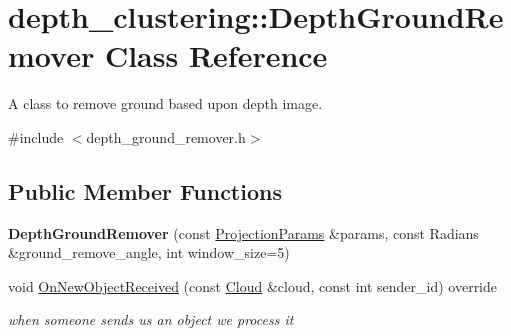 \hypertarget{classdepth__clustering_1_1DepthGroundRemover}{\section{depth\-\_\-clustering\-:\-:Depth\-Ground\-Remover Class Reference}
\label{classdepth__clustering_1_1DepthGroundRemover}
}


A class to remove ground based upon depth image.  




{\ttfamily \#include $<$depth\-\_\-ground\-\_\-remover.\-h$>$}

\subsection*{Public Member Functions}
\begin{DoxyCompactItemize}
\item 
\hypertarget{classdepth__clustering_1_1DepthGroundRemover_aae9816017a747246c495de41bcece02c}{{\bfseries Depth\-Ground\-Remover} (const \hyperlink{classdepth__clustering_1_1ProjectionParams}{Projection\-Params} \&params, const Radians \&ground\-\_\-remove\-\_\-angle, int window\-\_\-size=5)}\label{classdepth__clustering_1_1DepthGroundRemover_aae9816017a747246c495de41bcece02c}

\item 
void \hyperlink{classdepth__clustering_1_1DepthGroundRemover_ab2c3bcc8df6cc70ad5057f5ec3bd074f}{On\-New\-Object\-Received} (const \hyperlink{classdepth__clustering_1_1Cloud}{Cloud} \&cloud, const int sender\-\_\-id) override
\begin{DoxyCompactList}\small\item\em when someone sends us an object we process it \end{DoxyCompactList}\end{DoxyCompactItemize}
